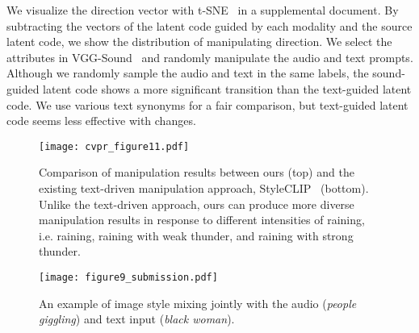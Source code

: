 \documentclass[10pt,twocolumn,letterpaper]{article}
\begin{document}
We visualize the direction vector with t-SNE~\cite{van2008visualizing} in a supplemental document. By subtracting the vectors of the latent code guided by each modality and the source latent code, we show the distribution of manipulating direction. 
We select the attributes in VGG-Sound~\cite{chen2020vggsound} and randomly manipulate the audio and text prompts.
Although we randomly sample the audio and text in the same labels, the sound-guided latent code shows a more significant transition than the text-guided latent code. We use various text synonyms for a fair comparison, but text-guided latent code seems less effective with changes. %


\begin{figure}[t!]
  \centering
  \texttt{[image: cvpr\_figure11.pdf]}
  \vspace{-1.3em}
  \caption{Comparison of manipulation results between ours (top) and the existing text-driven manipulation approach, StyleCLIP~\cite{Patashnik_2021_ICCV} (bottom). Unlike the text-driven approach, ours can produce more diverse manipulation results in response to different intensities of raining, i.e. raining, raining with weak thunder, and raining with strong thunder.}
  \label{fig:difference}
  \vspace{-0.8em}
\end{figure}

\begin{figure}[t!]
  \centering
  \texttt{[image: figure9\_submission.pdf]}
  \caption{An example of  image style mixing jointly with the audio (\textit{people giggling}) and text input (\textit{black woman}).}
  \label{fig:stylemixing}
   \vspace{-2em}
\end{figure}
\end{document}
